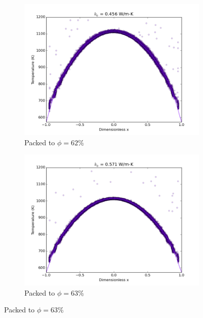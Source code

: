 \begin{figure}[!ht]
	\centering
	\begin{subfigure}[b]{0.4\textwidth}
		\centering
		\includegraphics[width=\textwidth]{chapters/figures/initial_packing_study/62percent-deform-packing.png}
		\caption{Packed to $\phi = 62\%$}
	\end{subfigure}
	
	\begin{subfigure}[b]{0.4\textwidth}
		\centering
		\includegraphics[width=\textwidth]{chapters/figures/initial_packing_study/63percent-deform-packing.png}
		\caption{Packed to $\phi = 63\%$}
	\end{subfigure}


\end{figure}
